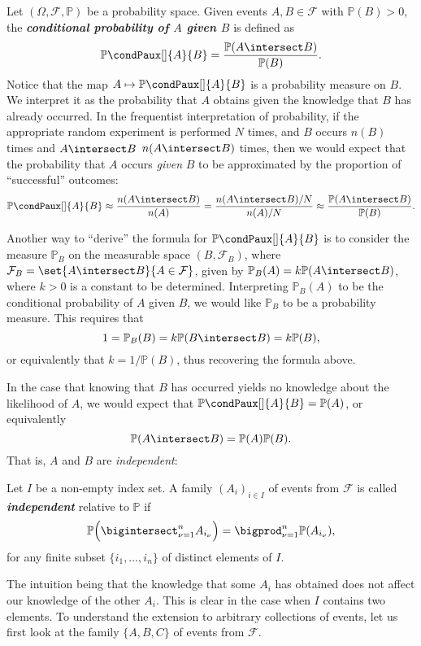\documentclass[article, a4paper, 11pt, oneside]{memoir}
\numberwithin{equation}{chapter}
\newcommand{\calF}{\mathcal{F}}
\renewcommand{\P}{\mathbb{P}}
\newcommand{\condP}[3][]{{\P\condPaux[#1]{#2}{#3}}}
\newcommand{\keyword}[1]{{\itshape\bfseries #1}}
\begin{document}
Let $(\Omega,\calF,\P)$ be a probability space. Given events $A,B \in \calF$ with $\P(B) > 0$, the \keyword{conditional probability of $A$ given $B$} is defined as
%
\begin{equation*}
    \condP{A}{B}
        = \frac{ \P(A \intersect B) }{ \P(B) }.
\end{equation*}
%
Notice that the map $A \mapsto \condP{A}{B}$ is a probability measure on $B$. We interpret it as the probability that $A$ obtains given the knowledge that $B$ has already occurred. In the frequentist interpretation of probability, if the appropriate random experiment is performed $N$ times, and $B$ occurs $n(B)$ times and $A \intersect B$ $n(A \intersect B)$ times, then we would expect that the probability that $A$ occurs \emph{given} $B$ to be approximated by the proportion of \enquote{successful} outcomes:
%
\begin{equation*}
    \condP{A}{B}
        \approx \frac{n(A \intersect B)}{n(A)}
        = \frac{n(A \intersect B)/N}{n(A)/N}
        \approx \frac{\P(A \intersect B)}{\P(B)}.
\end{equation*}

Another way to \enquote{derive} the formula for $\condP{A}{B}$ is to consider the measure $\P_B$ on the measurable space $(B,\calF_B)$, where $\calF_B = \set{A \intersect B}{A \in \calF}$, given by $\P_B(A) = k \P(A \intersect B)$, where $k > 0$ is a constant to be determined. Interpreting $\P_B(A)$ to be the conditional probability of $A$ given $B$, we would like $\P_B$ to be a probability measure. This requires that
%
\begin{equation*}
    1
        = \P_B(B)
        = k \P(B \intersect B)
        = k \P(B),
\end{equation*}
%
or equivalently that $k = 1/\P(B)$, thus recovering the formula above.

In the case that knowing that $B$ has occurred yields no knowledge about the likelihood of $A$, we would expect that $\condP{A}{B} = \P(A)$, or equivalently
%
\begin{equation*}
    \P(A \intersect B) = \P(A) \P(B).
\end{equation*}
%
That is, $A$ and $B$ are \emph{independent}:

\begin{definition}[Independence I]
    \label{def:independence-1}
    Let $I$ be a non-empty index set. A family $(A_i)_{i \in I}$ of events from $\calF$ is called \keyword{independent} relative to $\P$ if
    \begin{equation*}
        \P \Bigl( \bigintersect_{\nu = 1}^n A_{i_\nu} \Bigr)
            = \bigprod_{\nu = 1}^n \P(A_{i_\nu}),
    \end{equation*}
    for any finite subset $\{ i_1, \ldots, i_n \}$ of distinct elements of $I$.
\end{definition}
%
The intuition being that the knowledge that some $A_i$ has obtained does not affect our knowledge of the other $A_i$. This is clear in the case when $I$ contains two elements. To understand the extension to arbitrary collections of events, let us first look at the family $\{A, B, C\}$ of events from $\calF$.
\end{document}

